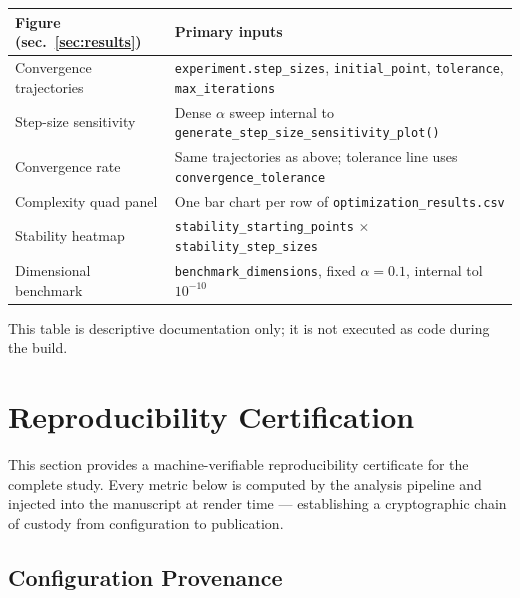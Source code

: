 \documentclass[
]{article}
\newcounter{none} %
\begin{document}
{\def\LTcaptype{none} %
\begin{longtable}[]{@{}
  >{\raggedright\arraybackslash}p{}
  >{\raggedright\arraybackslash}p{}@{}}
\toprule\noalign{}
\begin{minipage}[b]{\linewidth}\raggedright
Figure (sec.~\ref{sec:results})
\end{minipage} & \begin{minipage}[b]{\linewidth}\raggedright
Primary inputs
\end{minipage} \\
\midrule\noalign{}
\endhead
\bottomrule\noalign{}
\endlastfoot
Convergence trajectories & \texttt{experiment.step\_sizes},
\texttt{initial\_point}, \texttt{tolerance}, \texttt{max\_iterations} \\
Step-size sensitivity & Dense \(\alpha\) sweep internal to
\texttt{generate\_step\_size\_sensitivity\_plot()} \\
Convergence rate & Same trajectories as above; tolerance line uses
\texttt{convergence\_tolerance} \\
Complexity quad panel & One bar chart per row of
\texttt{optimization\_results.csv} \\
Stability heatmap & \texttt{stability\_starting\_points} \(\times\)
\texttt{stability\_step\_sizes} \\
Dimensional benchmark & \texttt{benchmark\_dimensions}, fixed
\(\alpha=0.1\), internal tol \(10^{-10}\) \\
\end{longtable}
}

This table is descriptive documentation only; it is not executed as code
during the build.

\newpage

\section{Reproducibility Certification}\label{sec:reproducibility}

This section provides a machine-verifiable reproducibility certificate
for the complete study. Every metric below is computed by the analysis
pipeline and injected into the manuscript at render time ---
establishing a cryptographic chain of custody from configuration to
publication.

\subsection{Configuration Provenance}\label{configuration-provenance}
\end{document}
